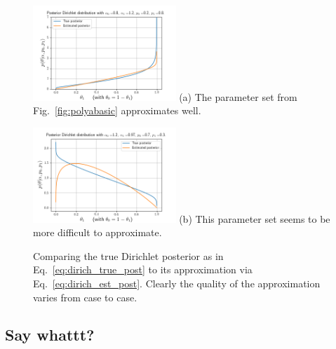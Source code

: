 \documentclass[oneside,english]{scrbook}
\begin{document}
\begin{figure}[!h]
  \begin{centering}
    \parbox{0.48\textwidth}{
      \centering
      \includegraphics[width=0.48\textwidth]{pdir1.png}
      (a) The parameter set from Fig.~\ref{fig:polyabasic} approximates well.
    }
  \end{centering}
  \begin{centering}
    \parbox{0.48\textwidth}{ \centering
      \includegraphics[width=0.48\textwidth]{pdir2.png}
      (b) This parameter set seems to be more difficult to approximate.
    }
  \end{centering}
  \caption{Comparing the true Dirichlet posterior as in
    Eq.~\ref{eq:dirich_true_post} to its approximation via
    Eq.~\ref{eq:dirich_est_post}. Clearly the quality of the
  approximation varies from case to case.}
\label{fig:post_dirichlet}
\end{figure}

\subsection{Say whattt?}
\end{document}
